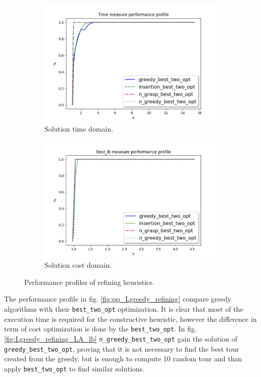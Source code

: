 \begin{figure}[!h]
	\centering
	\begin{subfigure}{.7\textwidth}
		\centering
		\includegraphics[width=\columnwidth]{../res/Lconstructives_refining_LA_time.png}
		\caption{Solution time domain.}
		\label{fig:Lconstructives_refining_time}
	\end{subfigure}
	\begin{subfigure}{.7\textwidth}
		\centering
		\includegraphics[width=\columnwidth]{../res/Lconstructives_refining_LA_lb.png}
		\caption{Solution cost domain.}
		\label{fig:Lconstructives_refining_lb}
	\end{subfigure}
\caption{Performance profiles of refining heuristics.}
\label{fig:pp_Lconstructives_refining}
\end{figure}

The performance profile in fig. \ref{fig:pp_Lgreedy_refining} compare greedy algorithms with their \texttt{best\_two\_opt} optimization. It is clear that most of the execution time is required for the constructive heuristic, however the difference in term of cost optimization is done by the \texttt{best\_two\_opt}. In fig. \ref{fig:Lgreedy_refining_LA_lb} \texttt{n\_greedy\_best\_two\_opt} gain the solution of \texttt{greedy\_best\_two\_opt}, proving that it is not necessary to find the best tour created from the greedy, but is enough to compute 10 random tour and than apply \texttt{best\_two\_opt} to find similar solutions.

